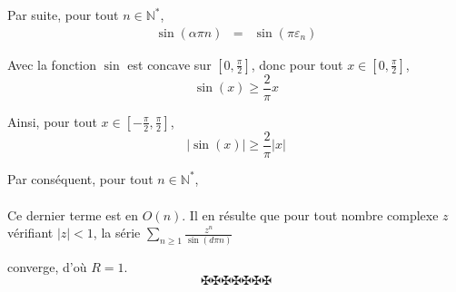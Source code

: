 Par suite, pour tout $n \in \mathbb{N}^{\ast}$,
\begin{eqnarray*}
  \sin (\alpha \pi n) & = & \sin (\pi \varepsilon_n)
\end{eqnarray*}


Avec la fonction $\sin$ est concave sur $\left[ 0, \frac{\pi}{2} \right]$,
donc pour tout $x \in \left[ 0, \frac{\pi}{2} \right]$,
\[ \sin (x) \geq \frac{2}{\pi} x \]


Ainsi, pour tout $x \in \left[ - \frac{\pi}{2}, \frac{\pi}{2} \right]$,
\[ | \sin (x) | \geqslant \frac{2}{\pi} | x | \]


Par cons{\'e}quent, pour tout $n \in \mathbb{N}^{\ast}$,
\begin{eqnarray*}
  &  & 
\end{eqnarray*}


Ce dernier terme est en $O (n)$. Il en r{\'e}sulte que pour tout nombre
complexe $z$ v{\'e}rifiant $|z| < 1$, la s{\'e}rie $\underset{n \geqslant
1}{\sum} \frac{z^n}{\sin (d \pi n)}$

converge, d'o{\`u} $R = 1$.
\[ \maltese \maltese \maltese \maltese \maltese \maltese \maltese \]
